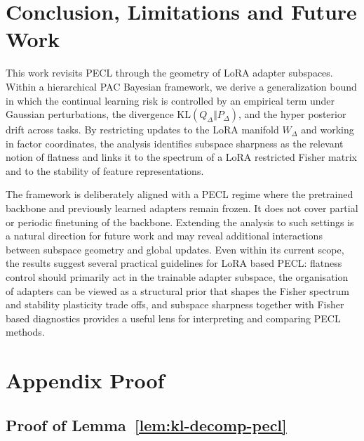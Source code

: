\documentclass{article}
\theoremstyle{plain}
\theoremstyle{definition}
\theoremstyle{remark}
\begin{document}
\section{Conclusion, Limitations and Future Work}
This work revisits PECL through the geometry of LoRA adapter subspaces. Within a hierarchical PAC Bayesian framework, we derive a generalization bound in which the continual learning risk is controlled by an empirical term under Gaussian perturbations, the divergence $\mathrm{KL}(Q_\Delta \Vert P_\Delta)$, and the hyper posterior drift across tasks. By restricting updates to the LoRA manifold $W_\Delta$ and working in factor coordinates, the analysis identifies subspace sharpness as the relevant notion of flatness and links it to the spectrum of a LoRA restricted Fisher matrix and to the stability of feature representations.

The framework is deliberately aligned with a PECL regime where the pretrained backbone and previously learned adapters remain frozen. It does not cover partial or periodic finetuning of the backbone. Extending the analysis to such settings is a natural direction for future work and may reveal additional interactions between subspace geometry and global updates. Even within its current scope, the results suggest several practical guidelines for LoRA based PECL: flatness control should primarily act in the trainable adapter subspace, the organisation of adapters can be viewed as a structural prior that shapes the Fisher spectrum and stability plasticity trade offs, and subspace sharpness together with Fisher based diagnostics provides a useful lens for interpreting and comparing PECL methods.




\clearpage      %
\onecolumn      %
\appendix       %

\section{Appendix Proof}


\subsection{Proof of Lemma~\ref{lem:kl-decomp-pecl}}
\label{proof:Lemma1}
\end{document}
